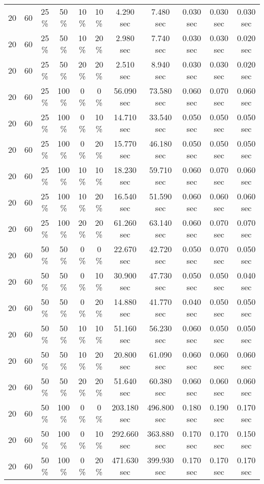 \documentclass{article}
\begin{document}
\begin{longtable}[]{@{}ccccccccccc@{}}
20 & 60 & 25 \% & 50 \% & 10 \% & 10 \% & 4.290 sec & 7.480 sec & 0.030 sec & 0.030 sec & 0.030 sec \\
20 & 60 & 25 \% & 50 \% & 10 \% & 20 \% & 2.980 sec & 7.740 sec & 0.030 sec & 0.030 sec & 0.020 sec \\
20 & 60 & 25 \% & 50 \% & 20 \% & 20 \% & 2.510 sec & 8.940 sec & 0.030 sec & 0.030 sec & 0.020 sec \\
20 & 60 & 25 \% & 100 \% & 0 \% & 0 \% & 56.090 sec & 73.580 sec & 0.060 sec & 0.070 sec & 0.060 sec \\
20 & 60 & 25 \% & 100 \% & 0 \% & 10 \% & 14.710 sec & 33.540 sec & 0.050 sec & 0.050 sec & 0.050 sec \\
20 & 60 & 25 \% & 100 \% & 0 \% & 20 \% & 15.770 sec & 46.180 sec & 0.050 sec & 0.050 sec & 0.050 sec \\
20 & 60 & 25 \% & 100 \% & 10 \% & 10 \% & 18.230 sec & 59.710 sec & 0.060 sec & 0.070 sec & 0.060 sec \\
20 & 60 & 25 \% & 100 \% & 10 \% & 20 \% & 16.540 sec & 51.590 sec & 0.060 sec & 0.060 sec & 0.060 sec \\
20 & 60 & 25 \% & 100 \% & 20 \% & 20 \% & 61.260 sec & 63.140 sec & 0.060 sec & 0.070 sec & 0.070 sec \\
20 & 60 & 50 \% & 50 \% & 0 \% & 0 \% & 22.670 sec & 42.720 sec & 0.050 sec & 0.070 sec & 0.050 sec \\
20 & 60 & 50 \% & 50 \% & 0 \% & 10 \% & 30.900 sec & 47.730 sec & 0.050 sec & 0.050 sec & 0.040 sec \\
20 & 60 & 50 \% & 50 \% & 0 \% & 20 \% & 14.880 sec & 41.770 sec & 0.040 sec & 0.050 sec & 0.050 sec \\
20 & 60 & 50 \% & 50 \% & 10 \% & 10 \% & 51.160 sec & 56.230 sec & 0.060 sec & 0.050 sec & 0.050 sec \\
20 & 60 & 50 \% & 50 \% & 10 \% & 20 \% & 20.800 sec & 61.090 sec & 0.060 sec & 0.060 sec & 0.060 sec \\
20 & 60 & 50 \% & 50 \% & 20 \% & 20 \% & 51.640 sec & 60.380 sec & 0.060 sec & 0.060 sec & 0.060 sec \\
20 & 60 & 50 \% & 100 \% & 0 \% & 0 \% & 203.180 sec & 496.800 sec & 0.180 sec & 0.190 sec & 0.170 sec \\
20 & 60 & 50 \% & 100 \% & 0 \% & 10 \% & 292.660 sec & 363.880 sec & 0.170 sec & 0.170 sec & 0.150 sec \\
20 & 60 & 50 \% & 100 \% & 0 \% & 20 \% & 471.630 sec & 399.930 sec & 0.170 sec & 0.170 sec & 0.170 sec \\

\end{longtable}
\end{document}
